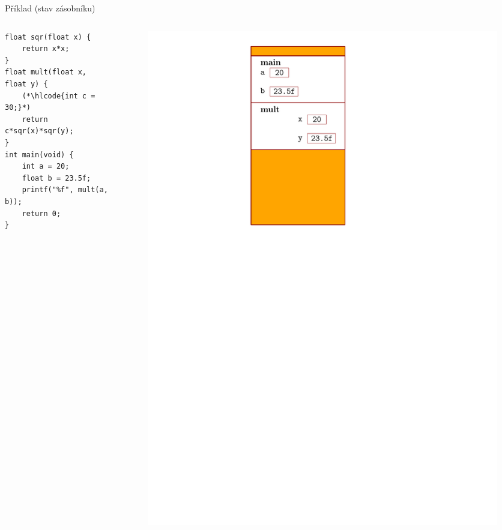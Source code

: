 \documentclass[14pt,aspectratio=169]{beamer}
\begin{document}
    \begin{frame}[t,fragile]{Příklad (stav zásobníku)}
        \begin{columns}[onlytextwidth]
            \begin{column}{0.55\textwidth}
                \begin{lstlisting}
float sqr(float x) {
    return x*x;
}
float mult(float x, float y) {
    (*\hlcode{int c = 30;}*)
    return c*sqr(x)*sqr(y);
}
int main(void) {
    int a = 20;
    float b = 23.5f;
    printf("%f", mult(a, b));
    return 0;
}
                \end{lstlisting}
            \end{column}
            \begin{column}{0.4\textwidth}
                \begin{figure}
                    \centering
                    \includegraphics[scale=.6]{images/zasobnik_stav_5.pdf}
                \end{figure}
            \end{column}
        \end{columns}
    \end{frame}
\end{document}

